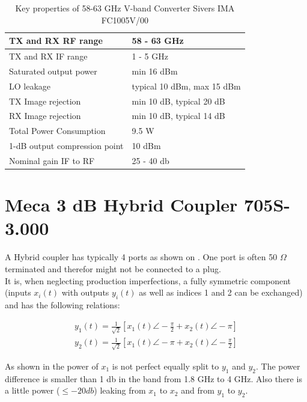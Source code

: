 \begin{table}
  \centering
  \begin{tabular}{|l|l|}
    \hline
    \gls{TX} and \gls{RX} \gls{RF} range & 58 - 63 GHz \\ \hline
    \gls{TX} and \gls{RX} \gls{IF} range & 1 - 5 GHz \\ \hline
    Saturated output power & min 16 dBm \\ \hline
    \gls{LO} leakage & typical 10 dBm, max 15 dBm \\ \hline
    \gls{TX} Image rejection & min 10 dB, typical 20 dB \\ \hline
    \gls{RX} Image rejection & min 10 dB, typical 14 dB \\ \hline
    Total Power Consumption & 9.5 W \\ \hline
    1-dB output compression point & 10 dBm \\ \hline
    Nominal gain \gls{IF} to \gls{RF} & 25 - 40 db \\ \hline
  \end{tabular}
  \caption{Key properties of 58-63 GHz V-band Converter Sivers IMA FC1005V/00
    \cite{sivers_fc1005v}}
  \label{tab:awg}
\end{table}

\section{Meca 3 dB Hybrid Coupler 705S-3.000}
\label{sec:comp_90deg}

A Hybrid coupler has typically 4 ports as shown on
.
One port is often 50 $\Omega$ terminated and therefor might not be connected
to a plug. \\

It is, when neglecting production imperfections, a fully symmetric component
(inputs $x_i(t)$ with outputs $y_i(t)$ as well as indices 1 and 2
can be exchanged) and has the following relations:

\begin{align}
  y_1(t) = \frac{1}{\sqrt{2}} \left[x_1(t) \angle -\frac{\pi}{2} + x_2(t) \angle -\pi \right] \\
  y_2(t) = \frac{1}{\sqrt{2}} \left[x_1(t) \angle -\pi + x_2(t) \angle -\frac{\pi}{2} \right]
\end{align}

As shown in  the power of
$x_1$ is not perfect equally split to $y_1$ and $y_2$. The power difference
is smaller than 1 db in the band from 1.8 GHz to 4 GHz.
Also there is a little power ($\leq -20 db$) leaking from $x_1$ to $x_2$ and from
$y_1$ to $y_2$. \\

